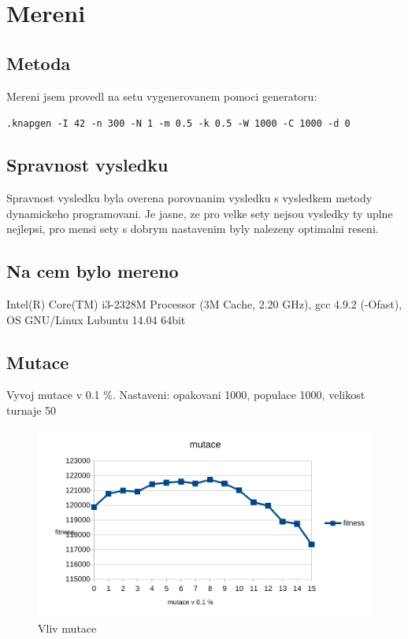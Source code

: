 \documentclass[12pt,a4paper]{article}
\begin{document}
\section{Mereni}

\subsection{Metoda}

Mereni jsem provedl na setu vygenerovanem pomoci generatoru:

\texttt{.\/knapgen -I 42 -n 300 -N 1 -m 0.5 -k 0.5 -W 1000 -C 1000 -d 0}

\subsection{Spravnost vysledku}
Spravnost vysledku byla overena porovnanim vysledku s vysledkem metody dynamickeho programovani. Je jasne, ze pro velke sety nejsou vysledky ty uplne nejlepsi, pro mensi sety s dobrym nastavenim byly nalezeny optimalni reseni.

\subsection{Na cem bylo mereno}
Intel(R) Core(TM) i3-2328M Processor (3M Cache, 2.20 GHz), gcc 4.9.2 (-Ofast), OS GNU/Linux Lubuntu 14.04 64bit

\subsection{Mutace}

Vyvoj mutace v 0.1 \%.
Nastaveni: opakovani 1000, populace 1000, velikost turnaje 50

\begin{figure}[H]
	\caption{Vliv mutace}
 	\centerline{\includegraphics{mutation.pdf}}
\end{figure}
\end{document}
